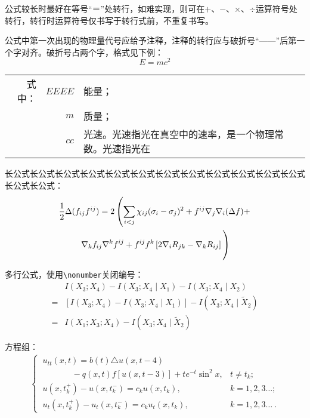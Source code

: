 公式较长时最好在等号“＝”处转行，如难实现，则可在$ + $、$ - $、$ \times $、$ \div $运算符号处转行，转行时运算符号仅书写于转行式前，不重复书写。

公式中第一次出现的物理量代号应给予注释，注释的转行应与破折号“——\nobreak”后第一个字对齐。破折号占两个字，格式见下例：
\begin{equation}\label{eq:norm}
E=mc^2
\end{equation}
\begin{flushleft}
    \begin{tabularx}{\textwidth}{@{}rr@{~——~}X@{}}
     式中：& $ EEEE $ & 能量； \\
          & $ m $    & 质量； \\
          & $ cc $   & 光速。光速指光在真空中的速率，是一个物理常数。光速指光在
    \end{tabularx}
\end{flushleft}

长公式长公式长公式长公式长公式长公式长公式长公式长公式长公式长公式长公式长公式长公式：
\begin{multline}\label{eq:long}
\frac{1}{2}\Delta(f_{ij}f^{ij})=
2\left(\sum_{i<j}\chi_{ij}(\sigma_i-\sigma_j)^2+f^{ij}\nabla_j\nabla_i(\Delta f)+\right .\\
\left .\nabla_kf_{ij}\nabla^kf^{ij}+f^{ij}f^k\left[2\nabla_iR_{jk}-\nabla_kR_{ij}\right]\vphantom{\sum_{i<j}}\right)
\end{multline}

多行公式，使用\verb|\nonumber|关闭编号：
\begin{align}\label{eq:align}
&I(X_3;X_4)-I(X_3;X_4\mid{}X_1)-I(X_3;X_4\mid{}X_2)\nonumber\\
=&[I(X_3;X_4)-I(X_3;X_4\mid{}X_1)]-I(X_3;X_4\mid{}\tilde{X}_2)\\
=&I(X_1;X_3;X_4)-I(X_3;X_4\mid{}\tilde{X}_2)
\end{align}

方程组：
\begin{align}
\begin{cases}
\ u_{tt}(x,t)= b(t)\triangle u(x,t-4)&\\
\ \hspace{42pt}- q(x,t)f[u(x,t-3)]+te^{-t}\sin^2 x,  &  t \neq t_k; \\
\ u(x,t_k^+) - u(x,t_k^-) = c_k u(x,t_k), & k=1,2,3\ldots ;\\
\ u_{t}(x,t_k^+) - u_{t}(x,t_k^-) =c_k u_{t}(x,t_k), &
k=1,2,3\ldots\ .
\end{cases}
\end{align}

